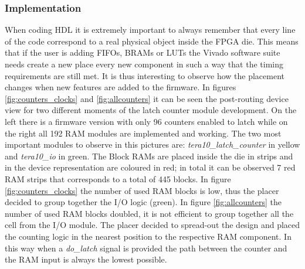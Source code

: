 \subsubsection{Implementation}
When coding HDL it is extremely important to always remember that every line of the code correspond to a real physical object inside the FPGA die. This means that if the user is adding FIFOs, BRAMs or LUTs the Vivado software suite needs create a new place every new component in such a way that the timing requirements are still met.
It is thus interesting to observe how the placement changes when new features are added to the firmware.
In figures \ref{fig:counters_clocks} and \ref{fig:allcounters} it can be seen the post-routing device view for two different moments of the latch counter module development. On the left there is a firmware version with only 96 counters enabled to latch while on the right all 192 RAM modules are implemented and working.
The two most important modules to observe in this pictures are: \textit{tera10\_latch\_counter} in yellow and \textit{tera10\_io} in green.
The Block RAMs are placed inside the die in strips and in the device representation are coloured in red; in total it can be observed 7 red RAM strips that corresponds to a total of 445 blocks.
In figure \ref{fig:counters_clocks} the number of used RAM blocks is low, thus the placer decided to group together the I/O logic (green).
In figure \ref{fig:allcounters} the number of used RAM blocks doubled, it is not efficient to group together all the cell from the I/O module. The placer decided to spread-out the design and placed the counting logic in the nearest position to the respective RAM component. In this way when a \textit{do\_latch} signal is provided the path between the counter and the RAM input is always the lowest possible. 
